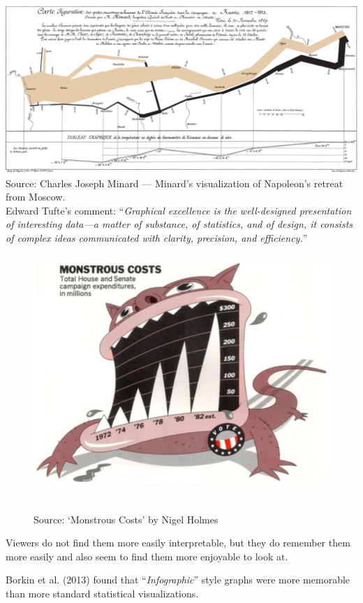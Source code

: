 \documentclass[11pt]{beamer}
\begin{document}
\begin{frame}
	
	\frametitle{\bfseries}
	\vspace{-1em}
	{\centering
		\includegraphics[width=1\linewidth]{Figure/minard}
		\\ 	\vspace{-1em}
		\tiny{Source: Charles Joseph Minard --- Minard’s visualization of Napoleon’s retreat from Moscow.}}\\
	\footnotesize {Edward Tufte's comment: ``\textit{Graphical excellence is the well-designed presentation of interesting data—a matter of substance, of statistics, and of design, it consists of complex ideas communicated with clarity, precision, and efficiency.}''}
\end{frame}


\begin{frame}
	
	\frametitle{\bfseries}
	\begin{figure}
		\vspace{-.5em}
		\includegraphics[width=0.6\linewidth]{Figure/holmes-monstrous-only}

		\\
		\tiny{Source: `Monstrous Costs’ by Nigel Holmes}
		\label{fig:anscombe-1}
	\end{figure}
	\begin{itemize}
		\footnotesize{
			\item Viewers do not find them more easily interpretable, but they do remember them more easily and also seem to find them more enjoyable to look at.
			\item Borkin et al. (2013) found that ``\textit{Infographic}'' style graphs were more memorable than more standard statistical visualizations. }
	\end{itemize}
\end{frame}
\end{document}
